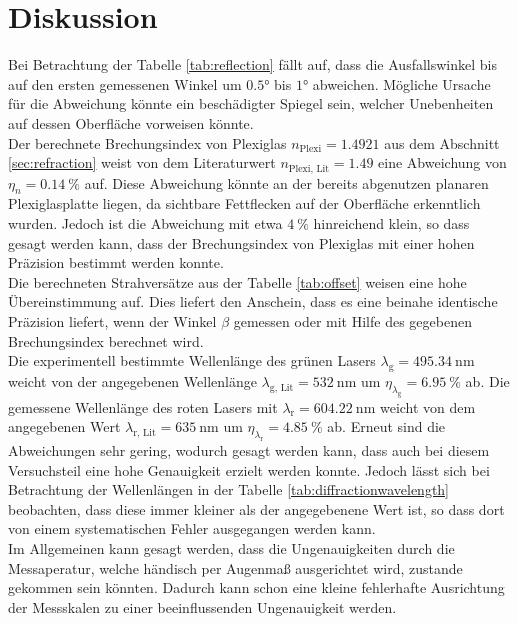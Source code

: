 \section{Diskussion}
\label{sec:Diskussion}
Bei Betrachtung der Tabelle \ref{tab:reflection} fällt auf, dass die Ausfallswinkel bis auf den ersten gemessenen Winkel um $\ang{0.5;;}$ bis 
$\ang{1;;}$ abweichen. Mögliche Ursache für die Abweichung könnte ein beschädigter Spiegel sein, welcher Unebenheiten auf dessen 
Oberfläche vorweisen könnte.\\
Der berechnete Brechungsindex von Plexiglas $n_\text{Plexi}=1.4921$ aus dem Abschnitt \ref{sec:refraction} weist von dem Literaturwert 
$n_\text{Plexi, Lit} = 1.49$\cite{lit} eine Abweichung von $\eta_n = \SI{0.14}{\percent}$ auf. 
Diese Abweichung könnte an der bereits abgenutzen planaren Plexiglasplatte liegen, da sichtbare Fettflecken auf der Oberfläche erkenntlich wurden.
Jedoch ist die Abweichung mit etwa $\SI{4}{\percent}$ hinreichend klein, so dass gesagt werden kann, dass der Brechungsindex von Plexiglas mit einer hohen 
Präzision bestimmt werden konnte.\\ 
Die berechneten Strahversätze aus der Tabelle \ref{tab:offset} weisen eine hohe Übereinstimmung auf.
Dies liefert den Anschein, dass es eine beinahe identische Präzision liefert, wenn der Winkel $\beta$ gemessen oder mit Hilfe des gegebenen
Brechungsindex berechnet wird.\\
Die experimentell bestimmte Wellenlänge des grünen Lasers $\lambda_\text{g} = \SI{495.34}{\nano\metre}$ weicht von der angegebenen 
Wellenlänge $\lambda_{\text{g, Lit}} = \SI{532}{\nano\metre}$ um $\eta_{\lambda_\text{g}} = \SI{6.95}{\percent}$ ab. Die gemessene Wellenlänge des roten Lasers mit
$\lambda_\text{r} = \SI{604.22}{\nano\metre}$ weicht von dem angegebenen Wert $\lambda_{\text{r, Lit}} = \SI{635}{\nano\metre}$ um
$\eta_{\lambda_\text{r}} = \SI{4.85}{\percent}$ ab.
Erneut sind die Abweichungen sehr gering, wodurch gesagt werden kann, dass auch bei diesem Versuchsteil eine hohe Genauigkeit erzielt werden konnte.
Jedoch lässt sich bei Betrachtung der Wellenlängen in der Tabelle \ref{tab:diffractionwavelength} beobachten, dass diese immer kleiner als der angegebenene Wert ist, 
so dass dort von einem systematischen Fehler ausgegangen werden kann. \\
Im Allgemeinen kann gesagt werden, dass die Ungenauigkeiten durch die Messaperatur, welche händisch per Augenmaß ausgerichtet wird, zustande gekommen sein könnten.
Dadurch kann schon eine kleine fehlerhafte Ausrichtung der Messskalen zu einer beeinflussenden Ungenauigkeit werden.